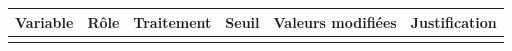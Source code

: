 \documentclass[

  french,

  10pt,

  a4paper,

]{article}
\newcounter{none} %
\begin{document}
{\def\LTcaptype{none} %

\begin{longtable}[]{@{}

  >{\raggedright\arraybackslash}p{}

  >{\raggedright\arraybackslash}p{}

  >{\raggedright\arraybackslash}p{}

  >{\raggedleft\arraybackslash}p{}

  >{\raggedleft\arraybackslash}p{}

  >{\raggedright\arraybackslash}p{}@{}}

\toprule\noalign{}

\begin{minipage}[b]{\linewidth}\raggedright

Variable

\end{minipage} & \begin{minipage}[b]{\linewidth}\raggedright

Rôle

\end{minipage} & \begin{minipage}[b]{\linewidth}\raggedright

Traitement

\end{minipage} & \begin{minipage}[b]{\linewidth}\raggedleft

Seuil

\end{minipage} & \begin{minipage}[b]{\linewidth}\raggedleft

Valeurs modifiées

\end{minipage} & \begin{minipage}[b]{\linewidth}\raggedright

Justification

\end{minipage} \\

\midrule\noalign{}

\endhead

\bottomrule\noalign{}


\end{longtable}}
\end{document}
